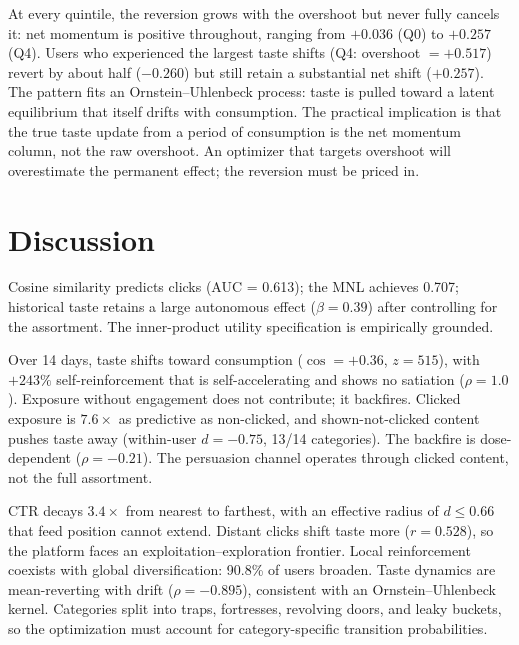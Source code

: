 \documentclass[11pt]{article}
\begin{document}
At every quintile, the reversion grows with the overshoot but never fully cancels it: net momentum is positive throughout, ranging from $+0.036$ (Q0) to $+0.257$ (Q4). Users who experienced the largest taste shifts (Q4: overshoot $= +0.517$) revert by about half ($-0.260$) but still retain a substantial net shift ($+0.257$). The pattern fits an Ornstein--Uhlenbeck process: taste is pulled toward a latent equilibrium that itself drifts with consumption. The practical implication is that the true taste update from a period of consumption is the net momentum column, not the raw overshoot. An optimizer that targets overshoot will overestimate the permanent effect; the reversion must be priced in.


\section{Discussion}
\label{sec:discussion}

Cosine similarity predicts clicks (AUC = 0.613); the MNL achieves 0.707; historical taste retains a large autonomous effect ($\beta = 0.39$) after controlling for the assortment. The inner-product utility specification is empirically grounded.

Over 14 days, taste shifts toward consumption ($\cos = +0.36$, $z = 515$), with $+243\%$ self-reinforcement that is self-accelerating and shows no satiation ($\rho = 1.0$). Exposure without engagement does not contribute; it backfires. Clicked exposure is $7.6\times$ as predictive as non-clicked, and shown-not-clicked content pushes taste away (within-user $d = -0.75$, 13/14 categories). The backfire is dose-dependent ($\rho = -0.21$). The persuasion channel operates through clicked content, not the full assortment.

CTR decays $3.4\times$ from nearest to farthest, with an effective radius of $d \leq 0.66$ that feed position cannot extend. Distant clicks shift taste more ($r = 0.528$), so the platform faces an exploitation--exploration frontier. Local reinforcement coexists with global diversification: 90.8\% of users broaden. Taste dynamics are mean-reverting with drift ($\rho = -0.895$), consistent with an Ornstein--Uhlenbeck kernel. Categories split into traps, fortresses, revolving doors, and leaky buckets, so the optimization must account for category-specific transition probabilities.
\end{document}
